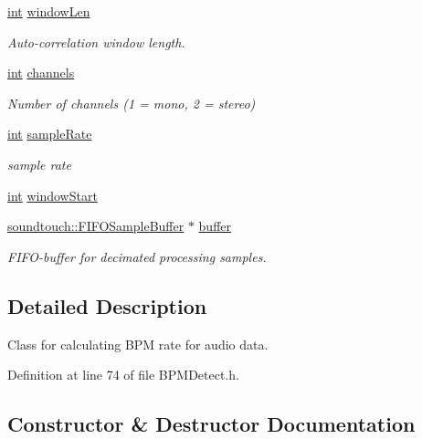 \begin{DoxyCompactItemize}
\hyperlink{xmltok_8h_a5a0d4a5641ce434f1d23533f2b2e6653}{int} \hyperlink{classsoundtouch_1_1_b_p_m_detect_af9a188ccdf522ec40b11d1da2fa80ace}{window\+Len}
\begin{DoxyCompactList}\small\item\em Auto-\/correlation window length. \end{DoxyCompactList}\item 
\hyperlink{xmltok_8h_a5a0d4a5641ce434f1d23533f2b2e6653}{int} \hyperlink{classsoundtouch_1_1_b_p_m_detect_a263b1b26a460bf619eed80dce8d03d90}{channels}
\begin{DoxyCompactList}\small\item\em Number of channels (1 = mono, 2 = stereo) \end{DoxyCompactList}\item 
\hyperlink{xmltok_8h_a5a0d4a5641ce434f1d23533f2b2e6653}{int} \hyperlink{classsoundtouch_1_1_b_p_m_detect_a9c0ca4351a4239dab4ad4d4655d7b8c9}{sample\+Rate}
\begin{DoxyCompactList}\small\item\em sample rate \end{DoxyCompactList}\item 
\hyperlink{xmltok_8h_a5a0d4a5641ce434f1d23533f2b2e6653}{int} \hyperlink{classsoundtouch_1_1_b_p_m_detect_a3bd374e10ddade57c3f7a90b143ec30e}{window\+Start}
\item 
\hyperlink{classsoundtouch_1_1_f_i_f_o_sample_buffer}{soundtouch\+::\+F\+I\+F\+O\+Sample\+Buffer} $\ast$ \hyperlink{classsoundtouch_1_1_b_p_m_detect_a5fdcd854846e3857638acf237473caac}{buffer}
\begin{DoxyCompactList}\small\item\em F\+I\+F\+O-\/buffer for decimated processing samples. \end{DoxyCompactList}\end{DoxyCompactItemize}


\subsection{Detailed Description}
Class for calculating B\+PM rate for audio data. 

Definition at line 74 of file B\+P\+M\+Detect.\+h.



\subsection{Constructor \& Destructor Documentation}
